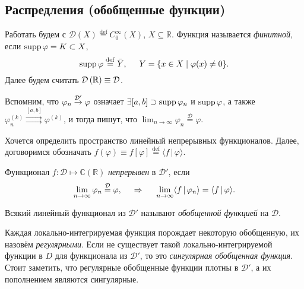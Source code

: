 

\subsection{Распредления (обобщенные функции)}

Работать будем с $\mathcal D (X) \overset{\mathrm{def}}{=} C_0^{\infty} (X)$, $X \subseteq \mathbb{R}$.  Функция называется \textit{финитной}, если $\mathop{\mathrm{supp}}\nolimits \varphi = K \subset X$, 
\begin{equation*}
    \mathop{\mathrm{supp}}\nolimits \varphi \overset{\mathrm{def}}{=} \bar{Y},
    \hspace{5 mm} 
    Y = \{x \in X \mid \varphi(x) \neq 0\}.
\end{equation*}
Далее будем считать $\mathcal D\left(\mathbb{R}\right) \equiv \mathcal D$. 

Вспомним, что $\varphi_n \overset{\mathcal D'}{\to} \varphi$ означает $\exists [a, b] \supset \mathop{\mathrm{supp}}\nolimits \varphi_n$ и $\mathop{\mathrm{supp}}\nolimits \varphi$, а также $\varphi_n^{(k)} \overset{[a, b]}{\rightrightarrows}  \varphi^{(k)}$, и тогда пишут, что $\lim_{n\to\infty} \varphi_n \overset{\mathcal D}{=}  \varphi$. 

Хочется определить пространство линейный непрерывных функционалов. Далее, договоримся обозначать $f(\varphi) \equiv f[\varphi] \overset{\mathrm{def}}{=} \langle f \,|\, \varphi \rangle$. 

\begin{to_def}
    Функционал $f \colon \mathcal D \mapsto \mathbb{C}(\mathbb{R})$ \textit{непрерывен} в $\mathcal D'$, если
    \begin{equation*}
        \lim_{n\to\infty} \varphi_n \overset{\mathcal D}{=}  \varphi,
        \hspace{0.5cm} \Rightarrow \hspace{0.5cm}
        \lim_{n\to\infty} \langle f \,|\, \varphi_n \rangle  = \langle f \,|\, \varphi \rangle.
    \end{equation*}
\end{to_def}

\begin{to_def}
    Всякий линейный функционал из $\mathcal D'$ называют \textit{обобщенной функцией} на $\mathcal D$. 
\end{to_def}

Каждая локально-интегрируемая функция порождает некоторую обобщенную, их назовём \textit{регулярными}. Если не существует такой локально-интегрируемой функции в $D$ для функционала из $\mathcal D'$, то это \textit{сингулярная обобщенная функция}. Стоит заметить, что регулярные обобщенные функции плотны в $\mathcal D'$, а их пополнением являются сингулярные. 

